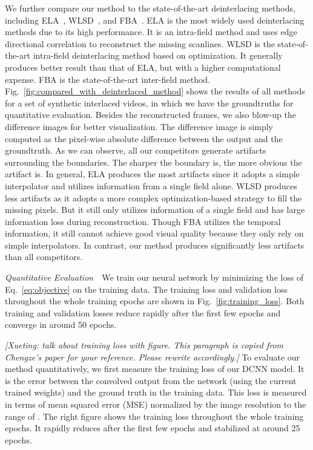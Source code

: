 \documentclass[acmtog]{acmart}
\begin{document}
We further compare our method to the state-of-the-art deinterlacing methods,
including ELA~\cite{doyle1990interlaced}, WLSD~\cite{wang2014interlacing}, and
FBA~\cite{vedadi2013interlacing}. ELA is the most widely used deinterlacing
methods due to its high performance. It is an intra-field method and uses edge
directional correlation to reconstruct the missing scanlines. WLSD is the state-of-the-art intra-field deinterlacing method based on optimization. It generally
produces better result than that of ELA, but with a higher computational
expense. FBA is the state-of-the-art inter-field method.
Fig.~\ref{fig:compared_with_deinterlaced_method} shows the results of all
methods for a set of synthetic interlaced videos, in which we have the
groundtruths for quantitative evaluation. Besides the reconstructed frames, we
also blow-up the difference images for better visualization. The difference
image is simply computed as the pixel-wise absolute difference between the
output and the groundtruth. As we can observe, all our competitors
generate artifacts surrounding the boundaries. The sharper the boundary is, the more
obvious the artifact is. In general, ELA produces the most artifacts since it
adopts a simple interpolator and utilizes information from a single field alone. 
WLSD produces less artifacts as it adopts a more complex optimization-based strategy to fill the missing pixels. But it still
only utilizes information of a single field and has large information loss
during reconstruction. Though FBA utilizes the temporal information, 
it still cannot achieve good visual quality because
they only rely on simple interpolators. In contrast, our method produces
significantly less artifacts than all competitors.



\vspace{0.15in}
\noindent\emph{Quantitative Evaluation}\,\,\,\,
We train our neural network by minimizing the loss of Eq.~\ref{eq:objective} on
the training data. The training loss and validation loss throughout the whole
training epochs are shown in Fig.~\ref{fig:training_loss}. Both training and
validation losses reduce rapidly after the first few epochs and converge in
around 50 epochs.

{\color{red} {\em [Xueting: talk about training loss with figure. This paragraph is copied from Chengze's paper for your reference. Please rewrite accordingly.]} To evaluate our method quantitatively, we first measure the training
loss of our DCNN model. It is the error between the convolved output from the network
(using the current trained weights) and the ground truth in the training data.
This loss is measured in terms of mean squared error (MSE)
normalized by the image resolution to the range of .
The right figure shows the training loss throughout the whole training epochs.
It rapidly reduces after the first few epochs and stabilized at around 25 epochs.}
\fi
\end{document}
